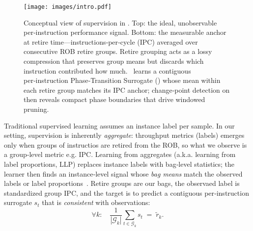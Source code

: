 \begin{figure}[!htbp]
    \centering
    \setlength{\belowcaptionskip}{-10pt}
    \captionsetup{skip=0pt}
    \captionsetup[subfigure]{font=footnotesize, skip=1pt}
    \texttt{[image: images/intro.pdf]}
    \caption{Conceptual view of supervision in \name. Top: the ideal, unobservable per‑instruction performance signal. Bottom: the measurable anchor at retire time—instructions‑per‑cycle (IPC) averaged over consecutive ROB retire groups. Retire grouping acts as a lossy compression that preserves group means but discards which instruction contributed how much. \name\ learns a contiguous per‑instruction Phase‑Transition Surrogate (\pts) whose mean within each retire group matches its IPC anchor; change‑point detection on \pts then reveals compact phase boundaries that drive windowed pruning.}
 
    \label{fig:benchmarks}
\end{figure}
Traditional supervised learning assumes an instance label per sample. In our setting, supervision is inherently \emph{aggregate}:  throughput metrics (labels) emerges only when groups of instructios are retired from the ROB, so what we observe is a group‑level metric e.g. IPC. Learning from aggregates (a.k.a. learning from label proportions, LLP) replaces instance labels with bag‑level statistics; the learner then finds an instance‑level signal whose \emph{bag means} match the observed labels or label proportions~\cite{yu2014-llp,scott2020-llp,law2018-agg,zhang2020-agg}. Retire groups are our bags, the observaed label is standardized group IPC, and the target is to predict a contiguous per‑instruction surrogate \(s_t\) that is \emph{consistent} with observations:
$$
\forall k:\quad \frac{1}{|\mathcal{G}_k|}\sum_{t\in \mathcal{G}_k} s_t \;=\; \tilde{r}_k.
$$

